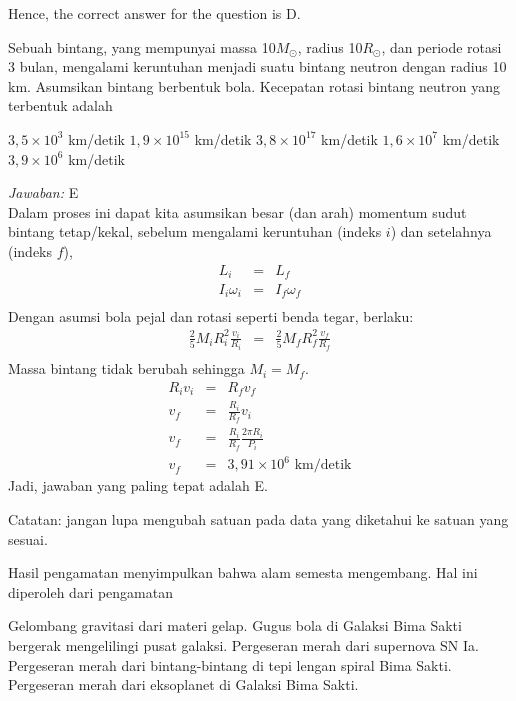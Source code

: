 \documentclass[11pt,fleqn]{exam}
\begin{document}
\begin{questions}
Hence, the correct answer for the question is D.

\vspace{1.5cm}
\question Sebuah bintang, yang mempunyai massa 10$M_{\odot}$, radius 10$R_{\odot}$, dan periode rotasi 3 bulan, mengalami keruntuhan menjadi suatu bintang neutron dengan radius 10 km. Asumsikan bintang berbentuk bola. Kecepatan rotasi bintang neutron yang terbentuk adalah
\begin{choices}
\choice $3,5\times 10^3$ km/detik
\choice $1,9\times 10^{15}$ km/detik
\choice $3,8\times 10^{17}$ km/detik
\choice $1,6\times 10^7$ km/detik
\choice $3,9\times 10^6$ km/detik
\end{choices}

\textit{Jawaban: }E\\
Dalam proses ini dapat kita asumsikan besar (dan arah) momentum sudut bintang tetap/kekal, sebelum mengalami keruntuhan (indeks $i$) dan setelahnya (indeks $f$),
\begin{eqnarray*}
L_i & = & L_f\\
I_i\omega_i & = & I_f\omega_f\\
\end{eqnarray*}
Dengan asumsi bola pejal dan rotasi seperti benda tegar, berlaku:
\begin{eqnarray*}
\frac{2}{5}M_iR_i^2\frac{v_i}{R_i} & = & \frac{2}{5}M_fR_f^2\frac{v_f}{R_f}\\
\end{eqnarray*}
Massa bintang tidak berubah sehingga $M_i=M_f$.
\begin{eqnarray*}
R_iv_i&=&R_fv_f\\
v_f&=&\frac{R_i}{R_f}v_i\\
v_f&=&\frac{R_i}{R_f}\frac{2\pi R_i}{P_i}\\
v_f&=&3,91\times 10^6\text{  km/detik}
\end{eqnarray*}
Jadi, jawaban yang paling tepat adalah E. 

Catatan: jangan lupa mengubah satuan pada data yang diketahui ke satuan yang sesuai.

\question Hasil pengamatan menyimpulkan bahwa alam semesta mengembang. Hal ini diperoleh dari pengamatan
\begin{choices}
\choice Gelombang gravitasi dari materi gelap.
\choice Gugus bola di Galaksi Bima Sakti bergerak mengelilingi pusat galaksi.
\choice Pergeseran merah dari supernova SN Ia.
\choice Pergeseran merah dari bintang-bintang di tepi lengan spiral Bima Sakti.
\choice Pergeseran merah dari eksoplanet di Galaksi Bima Sakti.
\end{choices}


\end{questions}
\end{document}

